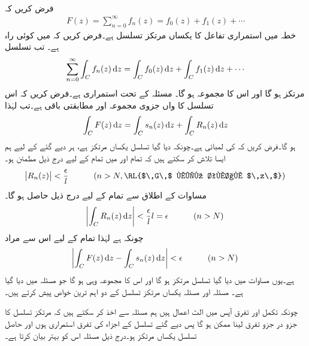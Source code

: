 \quad {}\\
فرض کریں کہ
\begin{align*}
F(z)=\sum\limits_{n=0}^{\infty} f_n(z)=f_0(z)+f_1(z)+\cdots
\end{align*}
خطہ  میں استمراری تفاعل کا یکساں مرتکز تسلسل ہے۔فرض کریں کہ  میں  کوئی راہ ہے۔ تب تسلسل
\begin{align}\label{مساوات_ٹیلر_جزو_در_جزو_قابل_تکمل_تسلسل}
\sum\limits_{n=0}^{\infty} \int_C f_n(z)\dif z=\int_C f_0(z)\dif z+\int_Cf_1(z)\dif z+\cdots
\end{align}
مرتکز ہو گا اور اس کا مجموعہ  ہو گا۔
\quad
مسئلہ  کے تحت  استمراری ہے۔فرض کریں کہ اس تسلسل کا  واں جزوی مجموعہ  اور مطابقتی باقی  ہے۔تب  لہٰذا
\begin{align*}
\int_CF(z)\dif z=\int_C s_n(z)\dif z+\int_C R_n(z)\dif z
\end{align*}
ہو گا۔فرض کریں کہ  کی لمبائی  ہے۔چونکہ دیا گیا تسلسل یکساں مرتکز ہے، ہر دیے گئے  کے لیے ہم ایسا  تلاش کر سکتے ہیں کہ تمام  اور  میں تمام  کے لیے درج ذیل مطمئن ہو۔
\begin{align*}
\abs{R_n(z)}<\frac{\epsilon}{l}\quad \quad \quad (n>N, \text{\RL{$\,G\,$ میں تمام $\,z\,$}})
\end{align*} 
مساوات  کے اطلاق سے تمام  کے لیے درج ذیل حاصل ہو گا۔
\begin{align*}
\abs{\int_C R_n(z)\dif z}<\frac{\epsilon}{l}l=\epsilon \quad \quad \quad (n>N)
\end{align*}
چونکہ  ہے لہٰذا تمام  کے لیے اس سے مراد 
\begin{align*}
\abs{\int_C F(z)\dif z-\int_C s_n(z)\dif z}<\epsilon\quad \quad \quad (n>N)
\end{align*}
ہے۔یوں مساوات  میں دیا گیا تسلسل مرتکز ہو گا اور اس کا مجموعہ وہی ہو گا جو مسئلہ میں دیا گیا ہے۔
 مسئلہ  اور مسئلہ  یکساں مرتکز تسلسل کے دو اہم ترین خواص پیش کرتے ہیں۔

چونکہ تکمل اور تفرق آپس میں الٹ اعمال ہیں ہم مسئلہ  سے اخذ کر سکتے ہیں کہ مرتکز تسلسل کا جزو در جزو تفرق لینا ممکن ہو گا پس دیے گئے تسلسل کے اجزاء کی تفرق استمراری ہوں اور حاصل تسلسل یکساں مرتکز ہو۔درج ذیل مسئلہ اس کو بہتر بیان کرتا ہے۔

